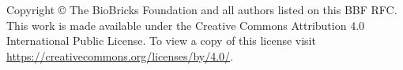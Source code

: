 

Copyright \copyright{} The BioBricks Foundation and all authors listed on this BBF RFC. This work is made available under the Creative Commons Attribution 4.0 International Public License. To view a copy of this license visit \href{https://creativecommons.org/licenses/by/4.0/}{https://creativecommons.org/licenses/by/4.0/}.

